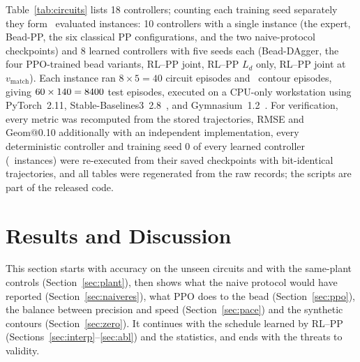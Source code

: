 \documentclass[conference]{IEEEtran}
\begin{document}
Table~\ref{tab:circuits} lists 18 controllers; counting each training seed separately they form \VnInst~evaluated instances: 10 controllers with a single instance (the expert, Bead-PP, the six classical PP configurations, and the two naive-protocol checkpoints) and 8 learned controllers with five seeds each (Bead-DAgger, the four PPO-trained bead variants, RL--PP joint, RL--PP $L_d$ only, RL--PP joint at $v_{\mathrm{match}}$). Each instance ran $8\times5=40$ circuit episodes and \VnSynthEval~contour episodes, giving $60\times140=8400$ test episodes, executed on a CPU-only workstation using PyTorch~2.11, Stable-Baselines3~2.8~\cite{raffin2021}, and Gymnasium~1.2~\cite{towers2024}. For verification, every metric was recomputed from the stored trajectories, RMSE and Geom@0.10 additionally with an independent implementation, every deterministic controller and training seed 0 of every learned controller (\VnRerun\ instances) were re-executed from their saved checkpoints with bit-identical trajectories, and all tables were regenerated from the raw records; the scripts are part of the released code.

\section{Results and Discussion}
This section starts with accuracy on the unseen circuits and with the same-plant controls (Section~\ref{sec:plant}), then shows what the naive protocol would have reported (Section~\ref{sec:naiveres}), what PPO does to the bead (Section~\ref{sec:ppo}), the balance between precision and speed (Section~\ref{sec:pace}) and the synthetic contours (Section~\ref{sec:zero}). It continues with the schedule learned by RL--PP (Sections~\ref{sec:interp}--\ref{sec:abl}) and the statistics, and ends with the threats to validity.
\end{document}
